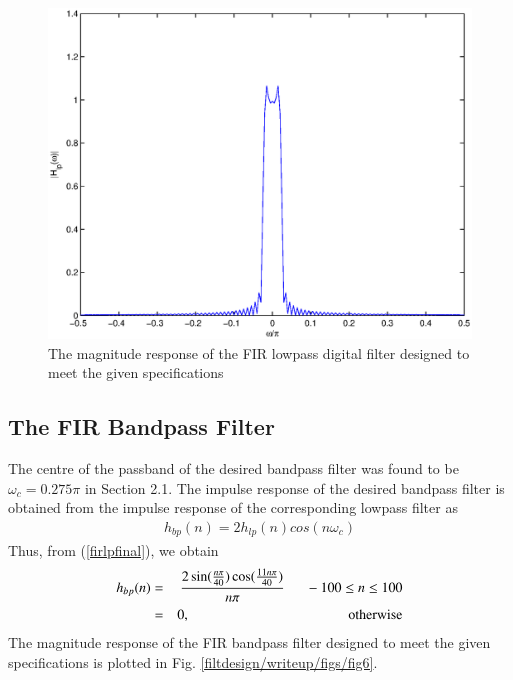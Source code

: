 \documentclass{article}
\begin{document}
\begin{figure}
\includegraphics[width = \columnwidth]{filtdesign/writeup/figs/fig5.eps}
\caption{The magnitude response of the FIR lowpass digital filter designed to meet the given specifications} 
	\label{filtdesign/writeup/figs/fig5}
\end{figure}

\subsection{The FIR Bandpass Filter}
The centre of the passband of the desired bandpass filter was found to be $\omega_c = 0.275\pi$ in Section
2.1.  The impulse response of the desired bandpass filter is obtained from the impulse response of the
corresponding lowpass filter as
\begin{eqnarray}
h_{bp}(n) = 2h_{lp}(n)cos(n\omega_c)
\end{eqnarray}
Thus, from (\ref{firlpfinal}), we obtain
\begin{eqnarray}
\label{firbpfinal}
h_{bp}(n) &=& \frac{2\sin(\frac{n\pi}{40}) \cos(\frac{11n\pi}{40})}{n\pi} \indent -100 \leq n \leq 100 \nonumber \\
&=& 0, \hspace{4cm} \mbox{otherwise}
\end{eqnarray}
%
The magnitude response of the FIR bandpass filter designed to meet the given specifications is plotted in Fig. \ref{filtdesign/writeup/figs/fig6}.
	
\end{document}
